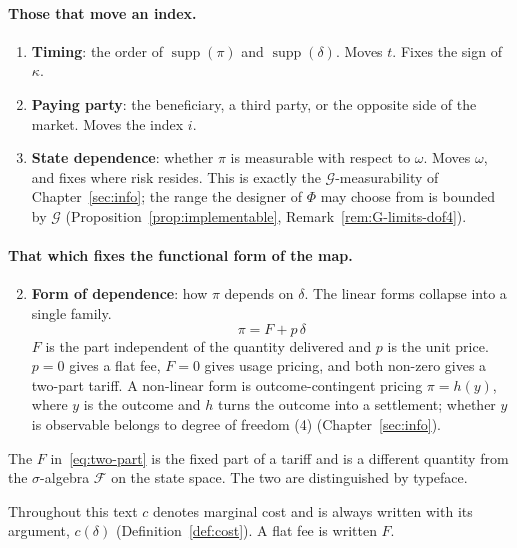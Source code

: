 \paragraph{Those that move an index.}
\begin{enumerate}[label=(\arabic*)]
\item \textbf{Timing}: the order of $\operatorname{supp}(\pi)$ and $\operatorname{supp}(\delta)$. Moves $t$. Fixes the sign of $\kappa$.
\setcounter{enumi}{2}
\item \textbf{Paying party}: the beneficiary, a third party, or the opposite side of the market. Moves the index $i$.
\item \textbf{State dependence}: whether $\pi$ is measurable with respect to $\omega$. Moves $\omega$, and fixes where risk resides.
This is exactly the $\mathcal{G}$-measurability of Chapter~\ref{sec:info}; the range the
designer of $\Phi$ may choose from is bounded by $\mathcal{G}$
(Proposition~\ref{prop:implementable}, Remark~\ref{rem:G-limits-dof4}).
\end{enumerate}

\paragraph{That which fixes the functional form of the map.}
\begin{enumerate}[label=(\arabic*)]
\setcounter{enumi}{1}
\item \textbf{Form of dependence}: how $\pi$ depends on $\delta$.
The linear forms collapse into a single family.
\begin{equation}
\pi = F + p\,\delta
\label{eq:two-part}
\end{equation}
$F$ is the part independent of the quantity delivered and $p$ is the unit price.
$p=0$ gives a flat fee, $F=0$ gives usage pricing, and both non-zero gives a two-part
tariff. A non-linear form is outcome-contingent pricing $\pi = h(y)$, where $y$ is the
outcome and $h$ turns the outcome into a settlement; whether $y$ is observable belongs to
degree of freedom (4) (Chapter~\ref{sec:info}).
\end{enumerate}

\begin{remark}
\label{rem:dof2-symbols}
The $F$ in~\eqref{eq:two-part} is the fixed part of a tariff and is a different quantity
from the $\sigma$-algebra $\mathcal{F}$ on the state space. The two are distinguished by
typeface.

Throughout this text $c$ denotes marginal cost and is always written with its argument,
$c(\delta)$ (Definition~\ref{def:cost}). A flat fee is written $F$.
\end{remark}

